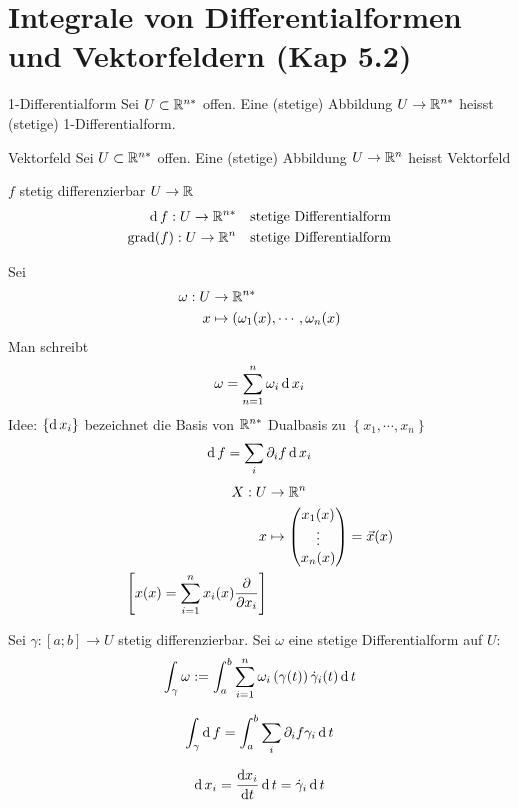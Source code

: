 \section{Integrale von Differentialformen und Vektorfeldern (Kap 5.2)}
\begin{Def}{1-Differentialform}
  Sei $U\subset\mathbb{R}^{n*}$ offen. Eine (stetige) Abbildung $U\to\mathbb{R}^{n*}$ heisst (stetige) 1-Differentialform.
\end{Def}
\begin{Def}{Vektorfeld}
  Sei $U\subset\mathbb{R}^{n*}$ offen. Eine (stetige) Abbildung $U\to\mathbb{R}^n$ heisst Vektorfeld
\end{Def}
\begin{Bsp}
  $f$ stetig differenzierbar $U\to\mathbb{R}$
  \begin{align*}
    \operatorname{d} f:U\to\mathbb{R}^{n*}&&\text{stetige Differentialform}\\
    \operatorname{grad}(f):U\to\mathbb{R}^{n}&&\text{stetige Differentialform}
  \end{align*}
\end{Bsp}
\begin{Not}
  Sei
  \begin{align*}
    \omega:U&\to\mathbb{R}^{n*}\\
    x&\mapsto(\omega_1(x),\cdots,\omega_n(x)
  \end{align*}
  Man schreibt
  \[\omega = \sum^n_{n=1}\omega_i\operatorname{d} x_i\]
  Idee: $\left\{ \operatorname{d} x_i \right\}$ bezeichnet die Basis von $\mathbb{R}^{n*}$ Dualbasis zu $\left\{ x_1,\cdots,x_n \right\}$
  \[\operatorname{d} f=\sum_i\partial_if\operatorname{d} x_i\]
  \begin{align*}
    X:U&\to\mathbb{R}^n\\
    x&\mapsto\begin{pmatrix}x_1(x)\\\vdots\\x_n(x)\end{pmatrix}= \vec x(x)\\
    \left[ x(x)=\sum^n_{i=1}x_i(x)\dfrac{\partial }{\partial x_i} \right]
  \end{align*}
\end{Not}
\begin{Def}
  Sei $\gamma:[a;b]\to U$ stetig differenzierbar. Sei $\omega$ eine stetige Differentialform auf $U$:
  \[\int_\gamma\omega:=\int_a^b\sum_{i=1}^n\omega_i\left( \gamma(t) \right)\dot\gamma_i(t)\operatorname{d} t\]
\end{Def}
\begin{Bsp}
  \[\int_\gamma\operatorname{d} f=\int_a^b\sum_i\partial_if\gamma_i\operatorname{d} t\]
\end{Bsp}
\begin{Not}
  \[\operatorname{d} x_i=\displaystyle\frac{\mathrm{d}x_i}{\mathrm{d}t}\operatorname{d} t=\dot\gamma_i\operatorname{d} t\]
\end{Not}
